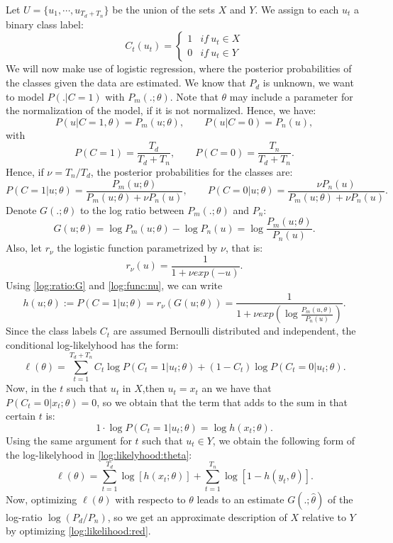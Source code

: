 Let $U = \{u_1,\cdots,u_{T_d + T_n}\}$ be the union of the sets $X$ and $Y$. We assign to each $u_t$ a binary class label:
\[
C_t(u_t) = \begin{cases}
1 & if \ u_t \in X\\
0 & if \ u_t \in Y
\end{cases}
\]
We will now make use of logistic regression, where the posterior probabilities of the classes given the data are estimated. We know that $P_d$ is unknown, we want to model $P(.|C=1)$ with $P_m(.;\theta)$. Note that $\theta$ may include a parameter for the normalization of the model, if it is not normalized. Hence, we have:
\[
P(u|C = 1,\theta) = P_m(u;\theta), \quad \quad P(u|C = 0) = P_n(u),
\]
with
\[
P(C = 1) = \frac{T_d}{T_d + T_n}, \quad \quad P(C = 0) = \frac{T_n}{T_d + T_n}.
\]
Hence, if $\nu = T_n/T_d$, the posterior probabilities for the classes are:
\[
P(C=1|u;\theta) = \frac{P_m(u;\theta)}{P_m(u;\theta) + \nu P_n(u)}, \quad \quad P(C = 0|u; \theta) = \frac{\nu P_n(u)}{P_m(u;\theta) + \nu P_n(u)}.
\]
Denote $G(.;\theta)$ to the log ratio between $P_m(.;\theta)$ and $P_n$:
\begin{equation}\label{log:ratio:G}
G(u;\theta) = \log P_m(u;\theta) - \log P_n(u) = \log \frac{P_m(u;\theta)}{P_n(u)}.
\end{equation}
Also, let $r_\nu$ the logistic function parametrized by $\nu$, that is:
\begin{equation}\label{log:func:nu}
r_\nu(u) = \frac{1}{1 + \nu exp(-u)}.
\end{equation}
Using \eqref{log:ratio:G} and \eqref{log:func:nu}, we can write
\[
h(u;\theta) := P(C = 1|u ; \theta) =    r_\nu(G(u;\theta)) = \frac{1}{1+ \nu exp(\log \frac{P_m(u,\theta)}{P_n(u)})}. 
\]
Since the class labels $C_t$ are assumed Bernoulli distributed and independent, the conditional log-likelyhood has the form:
\begin{equation}\label{log:likelihood:theta}
\ell(\theta)  = \sum_{t = 1}^{T_d + T_n} C_t \log P(C_t = 1|u_t; \theta) + (1-C_t) \log P(C_t = 0|u_t;\theta).
\end{equation}
Now, in the $t$ such that $u_t$ in $X$,then  $u_t = x_t$ an we have that $P(C_t = 0|x_t;\theta) = 0$, so we obtain that the term that adds to the sum in that certain $t$ is:
\[
1\cdot \log P(C_t = 1|u_t;\theta) = \log h(x_t;\theta).
\]
Using the same argument for $t$ such that $u_t \in Y$, we obtain the following form of the log-likelyhood in \eqref{log:likelyhood:theta}:
\begin{equation}\label{log:likelihood:red}
\ell(\theta) = \sum_{t = 1}^{T_d} \log [h(x_t;\theta)] + \sum_{t = 1}^{T_n} \log[1- h(y_t,\theta)].
\end{equation}
Now, optimizing $\ell(\theta)$ with respecto to $\theta$ leads to an estimate $G(.;\hat{\theta})$ of the log-ratio $\log (P_d/P_n)$, so we get an approximate description of $X$ relative to $Y$ by optimizing \eqref{log:likelihood:red}.

